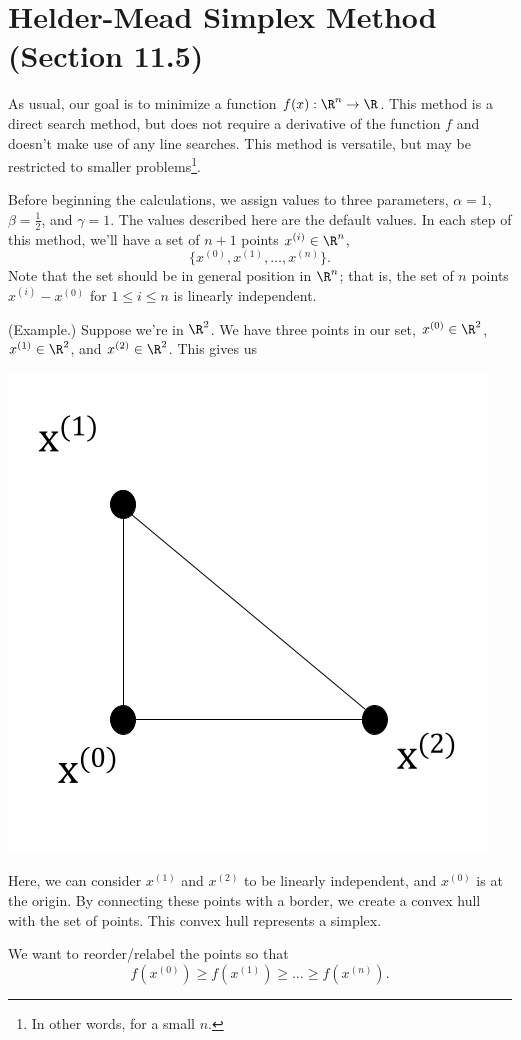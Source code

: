 \documentclass[letterpaper]{article}
\begin{document}
\section{Helder-Mead Simplex Method (Section 11.5)}
As usual, our goal is to minimize a function $f(x): \R^n \to \R$. This method is a direct search method, but does not require a derivative of the function $f$ and doesn't make use of any line searches. This method is versatile, but may be restricted to smaller problems\footnote{In other words, for a small $n$.}. 

\bigskip 

Before beginning the calculations, we assign values to three parameters, $\alpha = 1$, $\beta = \frac{1}{2}$, and $\gamma = 1$. The values described here are the default values. In each step of this method, we'll have a set of $n + 1$ points $x^{(i)} \in \R^n$,  
\[\{x^{(0)}, x^{(1)}, \hdots, x^{(n)}\}.\]
Note that the set should be in general position in $\R^n$; that is, the set of $n$ points $x^{(i)} - x^{(0)}$ for $1 \leq i \leq n$ is linearly independent.

\begin{mdframed}
    (Example.) Suppose we're in $\R^2$. We have three points in our set, $x^{(0)} \in \R^2$, $x^{(1)} \in \R^2$, and $x^{(2)} \in \R^2$. This gives us 
    \begin{center}
        \includegraphics[scale=0.4]{../assets/triangle_simplex.png}
    \end{center}
    Here, we can consider $x^{(1)}$ and $x^{(2)}$ to be linearly independent, and $x^{(0)}$ is at the origin. By connecting these points with a border, we create a convex hull with the set of points. This convex hull represents a simplex. 
\end{mdframed}
We want to reorder/relabel the points so that 
\[f(x^{(0)}) \geq f(x^{(1)}) \geq \hdots \geq f(x^{(n)}).\]
\end{document}
